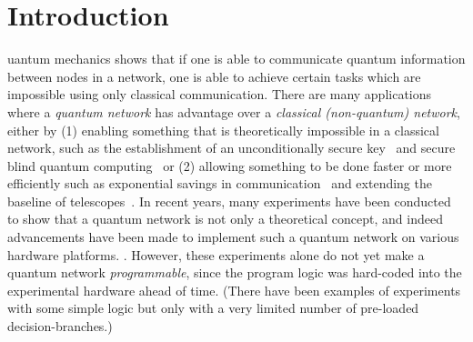 \section{Introduction}
\label{netqasm:sec:introduction}

uantum mechanics shows
that if one is able to communicate quantum information between nodes in a
network, one is able to achieve certain tasks which are impossible using only
classical communication. There are many applications~\cite{Wehner2018stages}
where a \emph{quantum network} has advantage over a \emph{classical
      (non-quantum) network}, either by (1) enabling something that is theoretically
impossible in a classical network, such as the establishment of an
unconditionally secure key~\cite{bb84} and secure blind quantum
computing~\cite{childs2005assisted} or (2) allowing something to be done faster
or more efficiently such as exponential savings in
communication~\cite{Buhrman2010} and extending the baseline of
telescopes~\cite{gottesman2012longer}. In recent years, many experiments have
been conducted to show that a quantum network is not only a theoretical concept,
and indeed advancements have been made to implement such a quantum network on
various hardware platforms. \cite{Hensen2015, Humphreys2018,
      moehring2007entanglement, hofmann2012heralded, Kalb2017, Inlek2017,
      sangouard2011quantum}. However, these experiments alone do not yet make a
quantum network \textit{programmable}, since the program logic was hard-coded
into the experimental hardware ahead of time. (There have been examples of
      experiments with some simple logic but only with a very limited number of
      pre-loaded decision-branches.)


